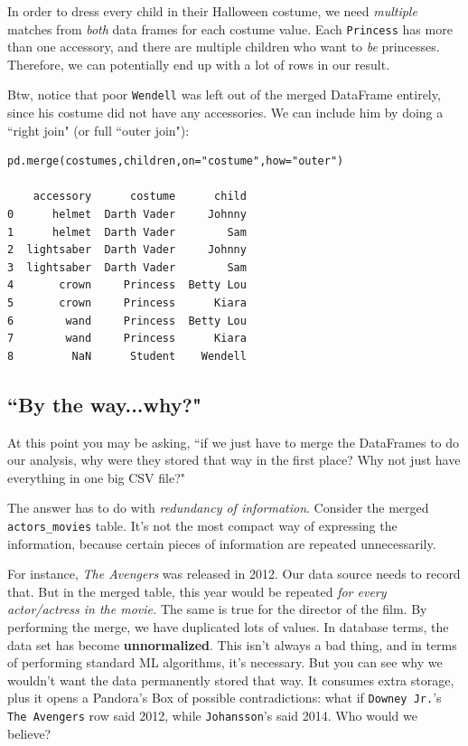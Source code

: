 \documentclass[12pt]{article}
\begin{document}
\begin{enumerate}
In order to dress every child in their Halloween costume, we need
\textit{multiple} matches from \textit{both} data frames for each costume
value. Each \texttt{Princess} has more than one accessory, and there are
multiple children who want to \textit{be} princesses. Therefore, we can
potentially end up with a lot of rows in our result.

Btw, notice that poor \texttt{Wendell} was left out of the merged DataFrame
entirely, since his costume did not have any accessories. We can include him
by doing a ``right join" (or full ``outer join"):

\begin{Verbatim}[fontsize=small,samepage=true,frame=none]
pd.merge(costumes,children,on="costume",how="outer")

    accessory      costume      child
0      helmet  Darth Vader     Johnny
1      helmet  Darth Vader        Sam
2  lightsaber  Darth Vader     Johnny
3  lightsaber  Darth Vader        Sam
4       crown     Princess  Betty Lou
5       crown     Princess      Kiara
6        wand     Princess  Betty Lou
7        wand     Princess      Kiara
8         NaN      Student    Wendell
\end{Verbatim}

\end{enumerate}

\pagebreak
\subsection{``By the way...why?"}

At this point you may be asking, ``if we just have to merge the DataFrames to
do our analysis, why were they stored that way in the first place? Why not
just have everything in one big CSV file?"

The answer has to do with \textit{redundancy of information}. Consider the
merged \texttt{actors\_movies} table. It's not the most compact way of
expressing the information, because certain pieces of information are repeated
unnecessarily.

For instance, \textit{The Avengers} was released in 2012. Our data source
needs to record that. But in the merged table, this year would be repeated
\textit{for every actor/actress in the movie.} The same is true for the
director of the film. By performing the merge, we have duplicated lots of
values. In database terms, the data set has become \textbf{unnormalized}. This
isn't always a bad thing, and in terms of performing standard ML algorithms,
it's necessary. But you can see why we wouldn't want the data permanently
stored that way. It consumes extra storage, plus it opens a Pandora's Box of
possible contradictions: what if \texttt{Downey Jr.}'s \texttt{The Avengers}
row said 2012, while \texttt{Johansson}'s said 2014. Who would we believe?
\end{document}
